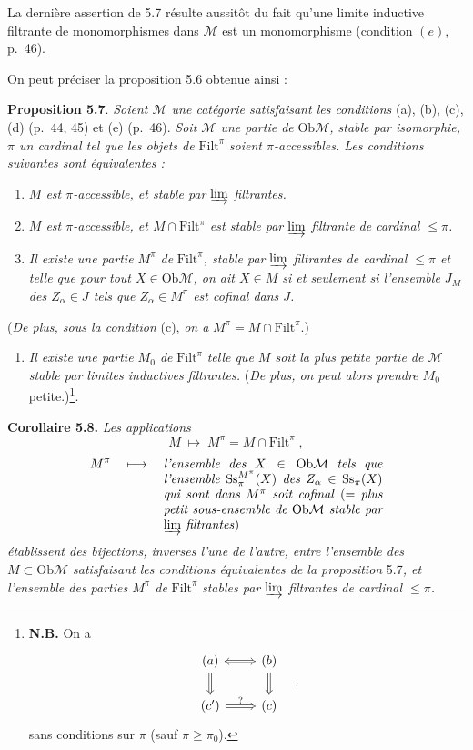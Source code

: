 \documentclass[11pt]{article}
\newcommand{\printedpage}[1]{\marginpar{\raggedright\footnotesize p.~#1}}
\newcommand{\msp}[1]{\marginpar{\raggedright\footnotesize [#1]}}
\newcommand{\Filt}{\mathrm{Filt}}
\newcommand{\Ob}{\mathrm{Ob}}
\newcommand{\Ss}{\mathrm{Ss}}
\newcommand{\M}{\mathcal{M}}
\begin{document}
\msp{page 57}

La dernière assertion de 5.7 résulte aussitôt du fait qu'une limite inductive filtrante de monomorphismes dans $\M$ est un monomorphisme (condition $(e)$, p.~46).

On peut préciser la proposition 5.6 obtenue ainsi :

\textbf{Proposition 5.7}. \textit{Soient $\M$ une catégorie satisfaisant les conditions} (a), (b), (c), (d) (p.~44, 45) et (e) (p.~46). \textit{Soit $\M$ une partie de} $\Ob\M$\textit{, stable par isomorphie, $\pi$ un cardinal tel que les objets de} $\Filt^\pi$ \textit{soient $\pi$-accessibles. Les conditions suivantes sont équivalentes :} %

\begin{enumerate}[label={}]
\item[a)] \textit{$M$ est $\pi$-accessible, et stable par $\varinjlim$ filtrantes.}
\item[b)] \textit{$M$ est $\pi$-accessible, et $M \cap \Filt^\pi$ est stable par $\varinjlim$ filtrante de cardinal $\leq \pi$.}
\item[c)] \textit{Il existe une partie $M^\pi$ de} $\Filt^\pi$\textit{, stable par $\varinjlim$ filtrantes de cardinal $\leq \pi$ et telle que pour tout $X \in \Ob\M$, on ait $X \in M$ si et seulement si l'ensemble $J_M$ des $Z_\alpha \in J$ tels que $Z_\alpha \in M^\pi$ est cofinal dans $J$.}
\end{enumerate}

(\textit{De plus, sous la condition} (c), \textit{on a}
\printedpage{35}
\msp{page 58}
$M^\pi = M \cap \Filt^\pi$.)
\begin{enumerate}[label={}]
\item[c$'$)] \textit{Il existe une partie $M_0$ de} $\Filt^\pi$ \textit{telle que $M$ soit la plus petite partie de $\M$ stable par limites inductives filtrantes.} (\textit{De plus, on peut alors prendre $M_0$} petite.)\footnote[22]{\textbf{N.B.} On a
\[
\begin{tikzcd}[ampersand replacement=\&]
(a) \arrow[r, Leftrightarrow] \arrow[d, Rightarrow] \& (b) \arrow[d, Rightarrow] \\
(c') \arrow[r, Rightarrow, "?"] \& (c)
\end{tikzcd}
\quad ,
\]
sans conditions sur $\pi$ (sauf $\pi \geq \pi_0$).}.
\end{enumerate}

\textbf{Corollaire 5.8.} \textit{Les applications}
\[
M \;\longmapsto\; M^\pi = M \cap \Filt^\pi \;,
\]
\[
M^\pi \quad\longmapsto\quad \parbox[t]{0.5\textwidth}{\textit{l'ensemble des $X \in \Ob\M$ tels que l'ensemble $\Ss_\pi^{M^\pi}(X)$ des $Z_\alpha \in \Ss_\pi(X)$ qui sont dans $M^\pi$ soit cofinal} (= \textit{plus petit sous-ensemble de $\Ob\M$ stable par $\varinjlim$ filtrantes})}
\]
\textit{établissent des bijections, inverses l'une de l'autre, entre l'ensemble des $M \subset \Ob\M$ satisfaisant les conditions équivalentes de la proposition} 5.7\textit{, et l'ensemble des parties $M^\pi$ de} $\Filt^\pi$ \textit{stables par $\varinjlim$ filtrantes de cardinal $\leq \pi$.}
\end{document}
